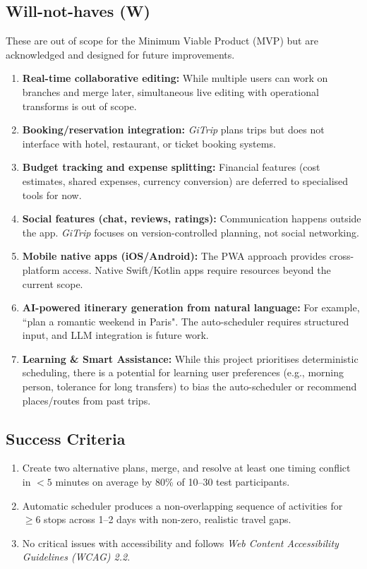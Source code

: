 \documentclass{article}
\begin{document}
\subsection*{Will-not-haves (W)}
These are out of scope for the Minimum Viable Product (MVP) but are acknowledged and designed for future improvements.
\begin{enumerate}[label=\textbf{W\arabic*}]
  \item \textbf{Real-time collaborative editing:} While multiple users can work on branches and merge later, simultaneous live editing with operational transforms is out of scope.
  
  \item \textbf{Booking/reservation integration:} \textit{GiTrip} plans trips but does not interface with hotel, restaurant, or ticket booking systems.

  \item \textbf{Budget tracking and expense splitting:} Financial features (cost estimates, shared expenses, currency conversion) are deferred to specialised tools for now.
  
  \item \textbf{Social features (chat, reviews, ratings):} Communication happens outside the app. \textit{GiTrip} focuses on version-controlled planning, not social networking.
  
  \item \textbf{Mobile native apps (iOS/Android):} The PWA approach provides cross-platform access. Native Swift/Kotlin apps require resources beyond the current scope.
  
  \item \textbf{AI-powered itinerary generation from natural language:} For example, ``plan a romantic weekend in Paris". The auto-scheduler requires structured input, and LLM integration is future work.

  \item \textbf{Learning \& Smart Assistance:} While this project prioritises deterministic scheduling, there is a potential for learning user preferences (e.g., morning person, tolerance for long transfers) to bias the auto-scheduler or recommend places/routes from past trips.\\
\end{enumerate}

\subsection{Success Criteria}
\begin{enumerate}
  \item Create two alternative plans, merge, and resolve at least one timing conflict in $<5$ minutes on average by 80\% of 10--30 test participants.
  \item Automatic scheduler produces a non-overlapping sequence of activities for $\ge 6$ stops across 1--2 days with non-zero, realistic travel gaps.
  \item No critical issues with accessibility and follows \textit{Web Content Accessibility Guidelines (WCAG) 2.2}\cite{wcag22}.
\end{enumerate}
\end{document}
